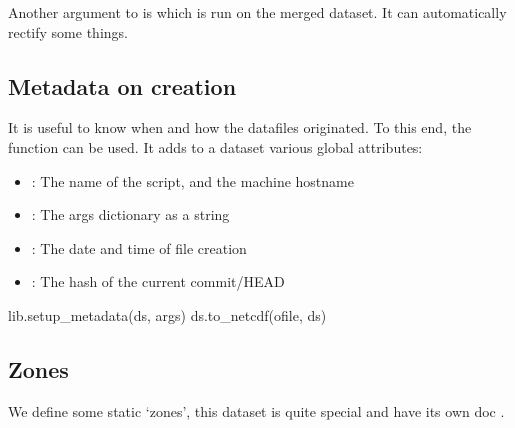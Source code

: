 Another argument to  is  which is run on the merged dataset.
It can automatically rectify some things.

\subsection{Metadata on creation}
It is useful to know when and how the datafiles originated.
To this end, the function  can be used.
It adds to a dataset various global attributes:
\begin{itemize}
  \item {}: The name of the script, and the machine hostname
  \item {}: The args dictionary as a string
  \item {}: The date and time of file creation
  \item {}: The hash of the current commit/HEAD
\end{itemize}

\begin{python}
lib.setup_metadata(ds, args)
ds.to_netcdf(ofile, ds)
\end{python}

\subsection{Zones}
We define some static `zones', this dataset is quite special and have its own doc .

